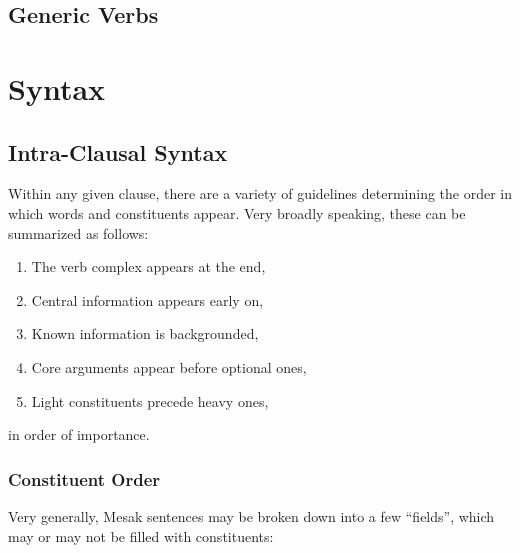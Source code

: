 \documentclass[paper=6in:9in, fontsize=10.5]{scrbook}
\newcommand{\ý}{ɨ́}
\begin{document}
{\section{Generic Verbs} \label{sec:genverbs}




\chapter{Syntax}
\section{Intra-Clausal Syntax}
Within any given clause, there are a variety of guidelines determining the order in which words and constituents appear. Very broadly speaking, these can be summarized as follows:

\begin{enumerate}
\item The verb complex appears at the end,
\item Central information appears early on,
\item Known information is backgrounded,
\item Core arguments appear before optional ones,
\item Light constituents precede heavy ones,
\end{enumerate}

in order of importance. 
\subsection{Constituent Order}
Very generally, Mesak sentences may be broken down into a few “fields”, which may or may not be filled with constituents:

}
\end{document}
